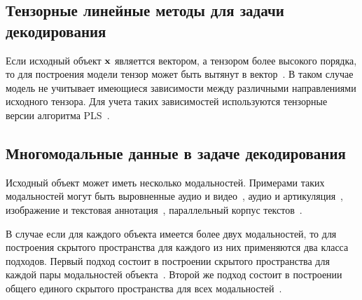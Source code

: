 \subsection{Тензорные линейные методы для задачи декодирования}

Если исходный объект $\mathbf{x}$ являеттся вектором, а тензором более высокого порядка, то для построения модели тензор может быть вытянут в вектор~\cite{cichocki2009nonnegative}. 
В таком случае модель не учитывает имеющиеся зависимости между различными направлениями исходного тензора.
Для учета таких зависимостей используются тензорные версии алгоритма PLS~\cite{zhao2012higher,eliseyev2013recursive,eliseyev2016penalized}.

\subsection{Многомодальные данные в задаче декодирования}

Исходный объект может иметь несколько модальностей. 
Примерами таких модальностей могут быть выровненные аудио и видео~\cite{kidron2005pixels,chaudhuri2009multi}, аудио и артикуляция~\cite{arora2012kernel}, изображение и текстовая аннотация~\cite{hardoon2004canonical,socher2010connecting,hodosh2013framing}, параллельный корпус текстов~\cite{vinokourov2003inferring,haghighi2008learning,ap2014autoencoder,faruqui2014improving}.

В случае если для каждого объекта имеется более двух модальностей, то для построения скрытого пространства для каждого из них применяются два класса подходов. 
Первый подход состоит в построении скрытого пространства для каждой пары модальностей объекта~\cite{masci2013multimodal,rajendran2015bridge}. 
Второй же подход состоит в построении общего единого скрытого пространства для всех модальностей~\cite{kumar2011co,sharma2012generalized}.